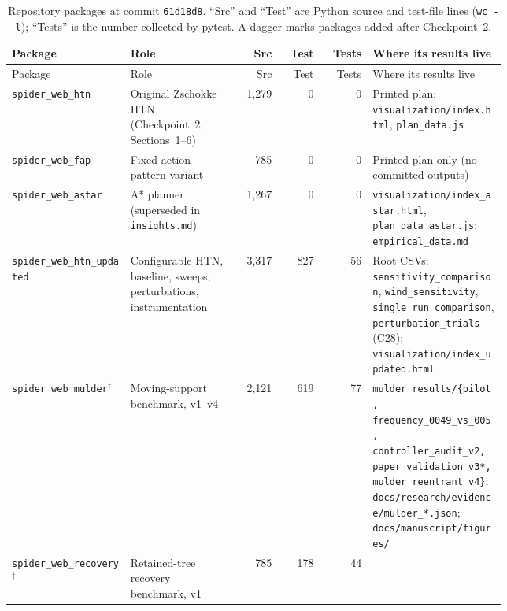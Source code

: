 {\footnotesize
\setlength{\tabcolsep}{3.5pt}
\begin{longtable}{@{}p{0.24\linewidth}p{0.22\linewidth}r r r p{0.27\linewidth}@{}}
\caption{Repository packages at commit \texttt{61d18d8}. ``Src'' and ``Test'' are Python source and
test-file lines (\texttt{wc -l}); ``Tests'' is the number collected by pytest. A dagger marks packages
added after Checkpoint~2.}
\label{tab:record-packages}\\
\toprule
Package & Role & Src & Test & Tests & Where its results live \\
\midrule
\endfirsthead
\toprule
Package & Role & Src & Test & Tests & Where its results live \\
\midrule
\endhead
\bottomrule
\endfoot
\texttt{spider\_web\_htn} & Original Zschokke HTN (Checkpoint~2, Sections~1--6) & 1,279 & 0 & 0 &
  Printed plan; \texttt{visualization/\allowbreak{}index.html}, \texttt{plan\_data.js} \\
\texttt{spider\_web\_fap} & Fixed-action-pattern variant & 785 & 0 & 0 & Printed plan only (no committed outputs) \\
\texttt{spider\_\allowbreak{}web\_\allowbreak{}astar} & A* planner (superseded in \texttt{insights.md}) & 1,267 & 0 & 0 &
  \texttt{visualization/\allowbreak{}index\_\allowbreak{}astar.html}, \texttt{plan\_\allowbreak{}data\_\allowbreak{}astar.js}; \texttt{empirical\_\allowbreak{}data.md} \\
\texttt{spider\_\allowbreak{}web\_\allowbreak{}htn\_\allowbreak{}updated} & Configurable HTN, baseline, sweeps, perturbations, instrumentation & 3,317 & 827 & 56 &
  Root CSVs: \texttt{sensitivity\_\allowbreak{}comparison}, \texttt{wind\_\allowbreak{}sensitivity}, \texttt{single\_\allowbreak{}run\_\allowbreak{}comparison},
  \texttt{perturbation\_\allowbreak{}trials} (C28); \texttt{visualization/\allowbreak{}index\_\allowbreak{}updated.html} \\
\texttt{spider\_\allowbreak{}web\_\allowbreak{}mulder}$^\dagger$ & Moving-support benchmark, v1--v4 & 2,121 & 619 & 77 &
  \texttt{mulder\_\allowbreak{}results/\allowbreak{}\{pilot, frequency\_\allowbreak{}0049\_\allowbreak{}vs\_\allowbreak{}005, controller\_\allowbreak{}audit\_\allowbreak{}v2, paper\_\allowbreak{}validation\_\allowbreak{}v3*, mulder\_\allowbreak{}reentrant\_\allowbreak{}v4\}};
  \texttt{docs/\allowbreak{}research/\allowbreak{}evidence/\allowbreak{}mulder\_\allowbreak{}*.json}; \texttt{docs/\allowbreak{}manuscript/\allowbreak{}figures/\allowbreak{}} \\
\texttt{spider\_\allowbreak{}web\_\allowbreak{}recovery}$^\dagger$ & Retained-tree recovery benchmark, v1 & 785 & 178 & 44 &

\end{longtable}}
